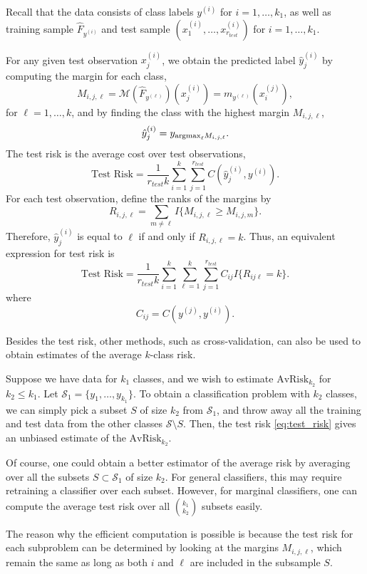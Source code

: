 Recall that the data consists of class labels $y^{(i)}$ for $i =
1,\hdots, k_1$, as well as training sample $\hat{F}_{y^{(i)}}$ and
test sample $(x_1^{(i)},\hdots, x_{r_{test}}^{(i)})$ for $i =
1,\hdots, k_1$.

For any given test observation $x_j^{(i)}$, we obtain the predicted
label $\hat{y}_j^{(i)}$ by computing the margin for each class,
\[
M_{i,j,\ell} = \mathcal{M}(\hat{F}_{y^{(\ell)}})(x_j^{(i)}) =  m_{y^{(\ell)}}(x_i^{(j)}),
\]
for $\ell = 1,\hdots, k$,
and by finding the class with the highest margin $M_{i, j, \ell}$,
\[
\hat{y}_j^{(i)} = y_{\text{argmax}_\ell M_{i, j, \ell}}.
\]
The test risk is the average cost over test observations,
\begin{equation}
\text{Test Risk} = \frac{1}{r_{test}k} \sum_{i=1}^k \sum_{j=1}^{r_{test}} C(\hat{y}_j^{(i)}, y^{(i)}).
\end{equation}
For each test observation, define the ranks of the margins by
\[
R_{i,j,\ell} = \sum_{m \neq \ell} I\{M_{i,j,\ell} \geq M_{i, j, m}\}.
\]
Therefore, $\hat{y}_j^{(i)}$ is equal to $\ell$ if and only if $R_{i,j,\ell} = k$.
Thus, an equivalent expression for test risk is
\begin{equation}\label{eq:test_risk}
\text{Test Risk} = \frac{1}{r_{test}k} \sum_{i=1}^k \sum_{\ell=1}^k \sum_{j=1}^{r_{test}} C_{ij} I\{R_{ij\ell} = k\}.
\end{equation}
where
\[
C_{ij} = C(y^{(j)}, y^{(i)}).
\]

Besides the test risk, other methods, such as cross-validation, can
also be used to obtain estimates of the average $k$-class risk.

Suppose we have data for $k_1$ classes, and we wish to estimate
$\text{AvRisk}_{k_2}$ for $k_2 \leq k_1$.  Let $\mathcal{S}_1
= \{y_1,\hdots,y_{k_1}\}$.  To obtain a classification problem with
$k_2$ classes, we can simply pick a subset $S$ of size $k_2$ from
$\mathcal{S}_1$, and throw away all the training and test data from the
other classes $\mathcal{S}\setminus S$.  Then, the test
risk \eqref{eq:test_risk} gives an unbiased estimate of the
$\text{AvRisk}_{k_2}$.

Of course, one could obtain a better estimator of the average risk by
averaging over all the subsets $S \subset \mathcal{S}_1$ of size
$k_2$.  For general classifiers, this may require retraining a
classifier over each subset.  However, for marginal classifiers, one
can compute the average test risk over all ${k_1}\choose{k_2}$ subsets
easily.

The reason why the efficient computation is possible is because the
test risk for each subproblem can be determined by looking at the
margins $M_{i, j, \ell}$, which remain the same as long as both $i$
and $\ell$ are included in the subsample $S$.


